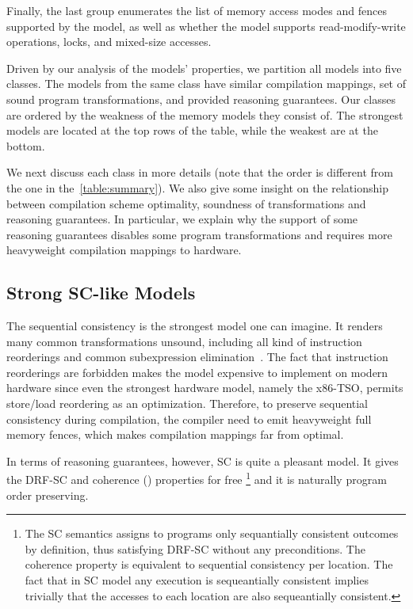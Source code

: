 Finally, the last group enumerates the list of memory access modes 
and fences supported by the model, as well as whether the model 
supports read-modify-write operations, locks, and mixed-size accesses.

Driven by our analysis of the models' properties, we partition all models into five classes. 
The models from the same class have similar compilation mappings, 
set of sound program transformations, and provided reasoning guarantees.
Our classes are ordered by the weakness of the memory models they consist of.  
The strongest models are located at the top rows of the table, 
while the weakest are at the bottom. 

We next discuss each class in more details
(note that the order is different from the one in the~\cref{table:summary}). 
We also give some insight on the relationship
between compilation scheme optimality, 
soundness of transformations and reasoning guarantees.
In particular, we explain why the support of some reasoning guarantees 
disables some program transformations and requires more heavyweight 
compilation mappings to hardware.

\subsection{Strong SC-like Models}

The sequential consistency is the strongest model one can imagine. 
It renders many common transformations unsound, 
including all kind of instruction reorderings and 
common subexpression elimination~\cite{Marino-el:PLDI11, Sevcik-Aspinall:ECOOP08}.
The fact that instruction reorderings are forbidden 
makes the model expensive to implement on modern hardware
since even the strongest hardware model, namely the x86-TSO,
permits store/load reordering as an optimization.
Therefore, to preserve sequential consistency during compilation,
the compiler need to emit heavyweight full memory fences,
which makes compilation mappings far from optimal.  

In terms of reasoning guarantees, however, SC is quite a pleasant model. 
It gives the DRF-SC and coherence () 
properties for free%
\footnote{The SC semantics assigns to programs only sequantially consistent
outcomes by definition, thus satisfying DRF-SC without any preconditions.
The coherence property is equivalent to sequential consistency per location.
The fact that in SC model any execution is sequeantially consistent implies trivially
that the accesses to each location are also sequeantially consistent.}
and it is naturally program order preserving.

